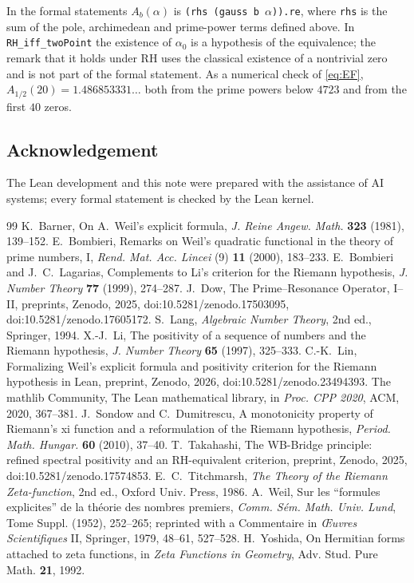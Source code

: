 \documentclass[11pt]{amsart}
\theoremstyle{remark}
\begin{document}
\noindent In the formal statements $A_b(\alpha)$ is \texttt{(rhs (gauss b $\alpha$)).re}, where \texttt{rhs} is the sum
of the pole, archimedean and prime-power terms defined above. In \texttt{RH\_iff\_twoPoint} the existence of
$\alpha_0$ is a hypothesis of the equivalence; the remark that it holds under RH uses the classical existence of a
nontrivial zero and is not part of the formal statement. As a numerical check of \eqref{eq:EF},
$A_{1/2}(20)=1.486853331\ldots$ both from the prime powers below $4723$ and from the first $40$ zeros.

\subsection*{Acknowledgement}
The Lean development and this note were prepared with the assistance of AI systems; every formal statement is
checked by the Lean kernel.

\begin{thebibliography}{99}
 K.~Barner, On A.~Weil's explicit formula, \emph{J. Reine Angew. Math.} \textbf{323} (1981), 139--152.
 E.~Bombieri, Remarks on Weil's quadratic functional in the theory of prime numbers, I,
\emph{Rend. Mat. Acc. Lincei} (9) \textbf{11} (2000), 183--233.
 E.~Bombieri and J.~C.~Lagarias, Complements to Li's criterion for the Riemann hypothesis,
\emph{J. Number Theory} \textbf{77} (1999), 274--287.
 J.~Dow, The Prime--Resonance Operator, I--II, preprints, Zenodo, 2025,
doi:10.5281/zenodo.17503095, doi:10.5281/zenodo.17605172.
 S.~Lang, \emph{Algebraic Number Theory}, 2nd ed., Springer, 1994.
 X.-J.~Li, The positivity of a sequence of numbers and the Riemann hypothesis,
\emph{J. Number Theory} \textbf{65} (1997), 325--333.
 C.-K.~Lin, Formalizing Weil's explicit formula and positivity criterion for the Riemann hypothesis
in Lean, preprint, Zenodo, 2026, doi:10.5281/zenodo.23494393.
 The mathlib Community, The Lean mathematical library, in \emph{Proc. CPP 2020}, ACM, 2020, 367--381.
 J.~Sondow and C.~Dumitrescu, A monotonicity property of Riemann's xi function and a reformulation
of the Riemann hypothesis, \emph{Period. Math. Hungar.} \textbf{60} (2010), 37--40.
 T.~Takahashi, The WB-Bridge principle: refined spectral positivity and an RH-equivalent
criterion, preprint, Zenodo, 2025, doi:10.5281/zenodo.17574853.
 E.~C.~Titchmarsh, \emph{The Theory of the Riemann Zeta-function}, 2nd ed., Oxford Univ. Press, 1986.
 A.~Weil, Sur les ``formules explicites'' de la th\'eorie des nombres premiers,
\emph{Comm. S\'em. Math. Univ. Lund}, Tome Suppl. (1952), 252--265; reprinted with a Commentaire in
\emph{\OE uvres Scientifiques} II, Springer, 1979, 48--61, 527--528.
 H.~Yoshida, On Hermitian forms attached to zeta functions, in \emph{Zeta Functions in Geometry},
Adv. Stud. Pure Math. \textbf{21}, 1992.
\end{thebibliography}
\end{document}
